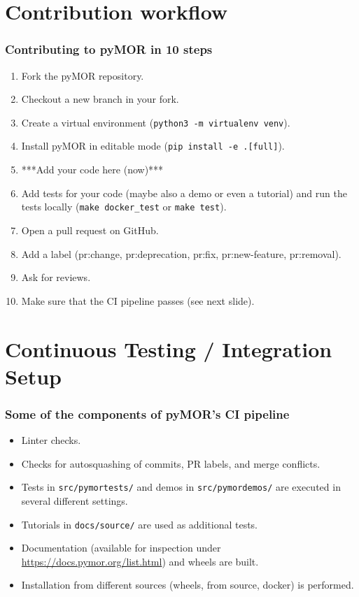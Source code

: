 \documentclass[%
]{beamer}
\begin{document}
\section{Contribution workflow}
\begin{frame}[fragile]
	\frametitle{Contributing to pyMOR in 10 steps}

	\begin{enumerate}
		\item Fork the pyMOR repository.
		\item Checkout a new branch in your fork.
		\item Create a virtual environment (\texttt{python3 -m virtualenv venv}).
		\item Install pyMOR in editable mode (\texttt{pip install -e .[full]}).
		\item ***Add your code here (now)***
		\item Add tests for your code (maybe also a demo or even a tutorial) and run the tests locally (\texttt{make docker_test} or \texttt{make test}).
		\item Open a pull request on GitHub.
		\item Add a label (pr:change, pr:deprecation, pr:fix, pr:new-feature, pr:removal).
		\item Ask for reviews.
		\item Make sure that the CI pipeline passes (see next slide).
	\end{enumerate}
\end{frame}
\section{Continuous Testing / Integration Setup}
\begin{frame}[fragile]
	\frametitle{Some of the components of pyMOR's CI pipeline}
	
	\begin{itemize}
		\item Linter checks.
		\item Checks for autosquashing of commits, PR labels, and merge conflicts.
		\item Tests in \texttt{src/pymortests/} and demos in \texttt{src/pymordemos/} are executed in several different settings.
		\item Tutorials in \texttt{docs/source/} are used as additional tests.
		\item Documentation (available for inspection under \href{https://docs.pymor.org/list.html}{https://docs.pymor.org/list.html}) and wheels are built.
		\item Installation from different sources (wheels, from source, docker) is performed.
	\end{itemize}
\end{frame}
\end{document}

